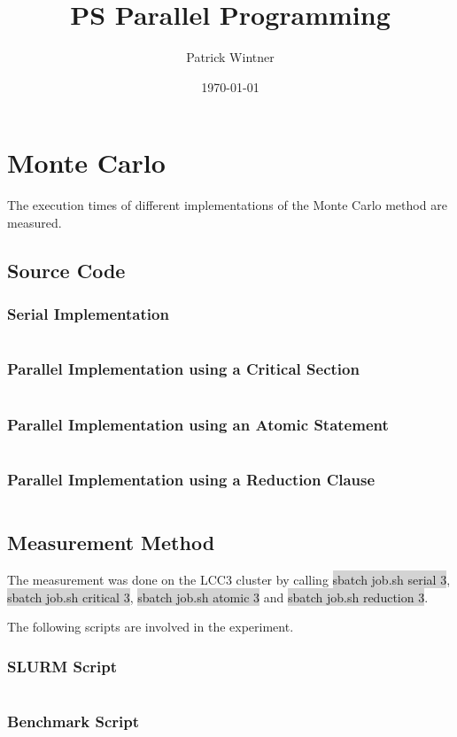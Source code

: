 \documentclass[parskip]{scrartcl}
\title{PS Parallel Programming}
\author{Patrick Wintner}
\date{\today}
\begin{document}
	\maketitle
	
	\section{Monte Carlo}
	\label{ex1}
	The execution times of different implementations of the Monte Carlo method are measured.
	\subsection{Source Code}
	\subsubsection{Serial Implementation}
	\inputminted	[linenos]{c}{ex1/serial.c}
	\subsubsection{Parallel Implementation using a Critical Section}
	\inputminted	[linenos]{c}{ex1/critical.c}
	\subsubsection{Parallel Implementation using an Atomic Statement}
	\inputminted	[linenos]{c}{ex1/atomic.c}
	\subsubsection{Parallel Implementation using a Reduction Clause}
	\inputminted	[linenos]{c}{ex1/reduction.c}
	\subsection{Measurement Method}
	The measurement was done on the LCC3 cluster by calling \colorbox{lightgray}{sbatch job.sh serial 3}, \colorbox{lightgray}{sbatch job.sh critical 3}, \colorbox{lightgray}{sbatch job.sh atomic 3} and \colorbox{lightgray}{sbatch job.sh reduction 3}.
	
	The following scripts are involved in the experiment.
	\subsubsection{SLURM Script}
	\inputminted[linenos]{bash}{ex1/job.sh}
	\subsubsection{Benchmark Script}
	\inputminted[linenos]{bash}{ex1/benchmark.sh}
	
\end{document}
